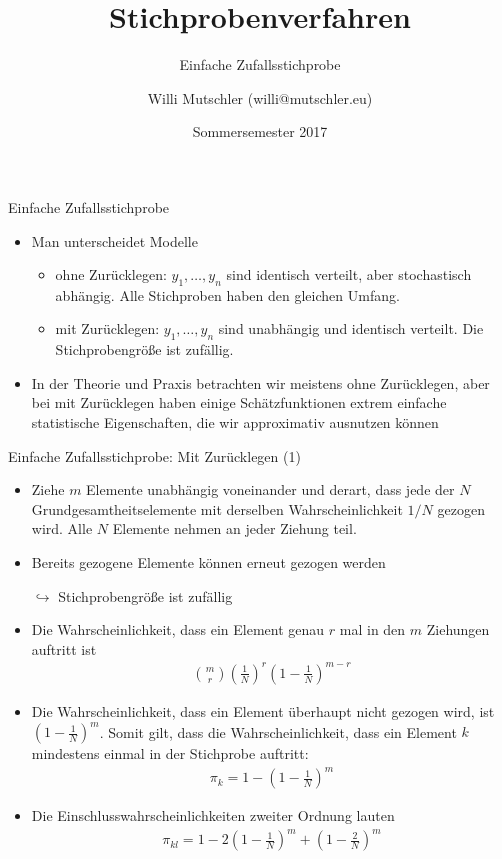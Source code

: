 \documentclass[9pt]{beamer}
\title{Stichprobenverfahren}
\subtitle{Einfache Zufallsstichprobe}
\date[SS2017]{Sommersemester 2017}
\author{Willi Mutschler (willi@mutschler.eu)}
\begin{document}
\maketitle
\begin{frame}{Einfache Zufallsstichprobe}
\begin{itemize}
	\item Man unterscheidet Modelle
	\begin{itemize}
		\item ohne Zurücklegen: $y_1, \dots, y_n$ sind identisch verteilt, aber stochastisch abhängig. Alle Stichproben haben den gleichen Umfang.
		\item mit Zurücklegen: $y_1, \dots, y_n$ sind unabhängig und identisch verteilt. Die Stichprobengröße ist zufällig.
	\end{itemize} 
	\item In der Theorie und Praxis betrachten wir meistens ohne Zurücklegen, aber bei mit Zurücklegen haben einige Schätzfunktionen extrem einfache statistische Eigenschaften, die wir approximativ ausnutzen können
\end{itemize}
\end{frame}

\begin{frame}{Einfache Zufallsstichprobe: Mit Zurücklegen (1)}
\begin{itemize}
	\item Ziehe $m$ Elemente unabhängig voneinander und derart, dass jede der $N$ Grundgesamtheitselemente mit derselben Wahrscheinlichkeit $1/N$ gezogen wird. Alle $N$ Elemente nehmen an jeder Ziehung teil.
	\item Bereits gezogene Elemente können erneut gezogen werden 
	\item[$\hookrightarrow$] Stichprobengröße ist zufällig
	\item Die Wahrscheinlichkeit, dass ein Element genau $r$ mal in den $m$ Ziehungen auftritt ist
	\begin{align*}
	\binom{m}{r}\left(\frac{1}{N}\right)^r \left(1-\frac{1}{N}\right)^{m-r}
	\end{align*}
	\item Die Wahrscheinlichkeit, dass ein Element überhaupt nicht gezogen wird, ist $\left(1-\frac{1}{N}\right)^m$. Somit gilt, dass die Wahrscheinlichkeit, dass ein Element $k$ mindestens einmal in der Stichprobe auftritt:
	\begin{align*}
	\pi_k = 1- \left(1-\frac{1}{N}\right)^m
	\end{align*}
	\item Die Einschlusswahrscheinlichkeiten zweiter Ordnung lauten
	\begin{align*}
	\pi_{kl}= 1-2\left(1-\frac{1}{N}\right)^m + \left(1-\frac{2}{N}\right)^m
	\end{align*}
\end{itemize}
\end{frame}
\end{document}
